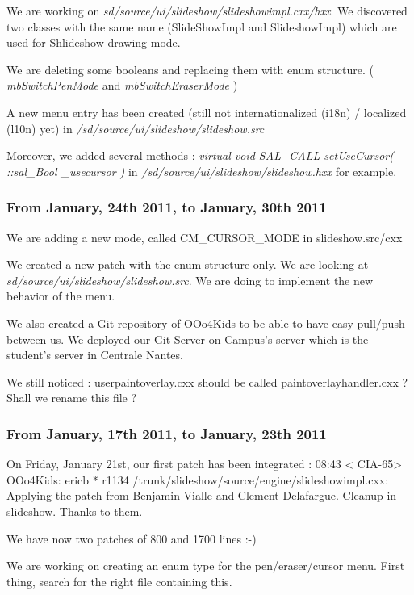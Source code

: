 \documentclass[a4paper,11pt]{article}
\begin{document}
We are working on \emph{sd/source/ui/slideshow/slideshowimpl.cxx/hxx}. We
discovered two classes with the same name (SlideShowImpl and SlideshowImpl)
which are used for Shlideshow drawing mode.

We are deleting some booleans and replacing them with enum structure. (
\emph{mbSwitchPenMode} and \emph{mbSwitchEraserMode} )

A new menu entry has been created (still not internationalized (i18n) /
localized (l10n) yet) in \emph{/sd/source/ui/slideshow/slideshow.src}

Moreover, we added several methods : \emph{virtual void SAL\_CALL
setUseCursor( ::sal\_Bool \_usecursor )} in
\emph{/sd/source/ui/slideshow/slideshow.hxx} for example.

\subsubsection*{From January, 24th 2011, to January, 30th 2011}

We are adding a new mode, called CM\_CURSOR\_MODE in slideshow.src/cxx

We created a new patch with the enum structure only. We are looking at
\emph{sd/source/ui/slideshow/slideshow.src}. We are doing to implement the new
behavior of the menu.

We also created a Git repository of OOo4Kids to be able to have easy pull/push
between us. We deployed our Git Server on Campus's server which is the
student's server in Centrale Nantes.

We still noticed : userpaintoverlay.cxx should be called
paintoverlayhandler.cxx ? Shall we rename this file ?

\subsubsection*{From January, 17th 2011, to January, 23th 2011}

On Friday, January 21st, our first patch has been integrated : 08:43 < CIA-65>
OOo4Kids: ericb * r1134 /trunk/slideshow/source/engine/slideshowimpl.cxx:
Applying the patch from Benjamin Vialle and Clement Delafargue. Cleanup in
slideshow. Thanks to them.

We have now two patches of 800 and 1700 lines :-)

We are working on creating an enum type for the pen/eraser/cursor menu. First
thing, search for the right file containing this.
\end{document}
